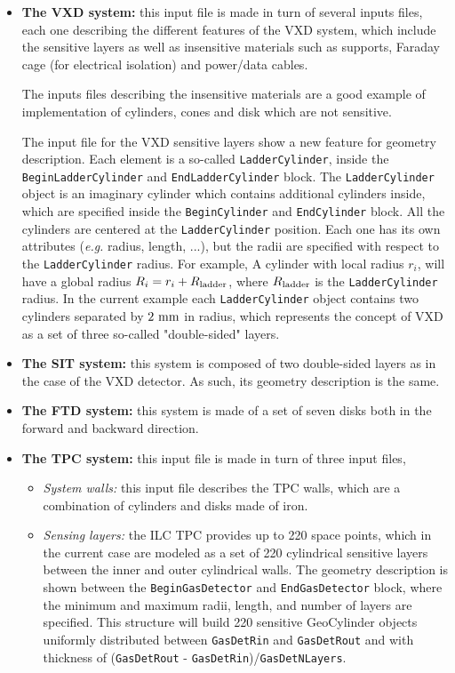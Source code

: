 \begin{itemize}
 \item  {\bf The VXD system:} this input file is made in turn of several inputs files, each one describing the different features of the VXD system, which include 
 the sensitive layers as well as insensitive materials such as supports, Faraday cage (for electrical isolation) and power/data cables.
 
 The inputs files describing the insensitive materials are a good example of implementation of cylinders, cones and disk which are not sensitive.
 
 The input file for the VXD sensitive layers show a new feature for geometry description. Each element is a so-called {\tt LadderCylinder}, inside the 
 {\tt BeginLadderCylinder} and {\tt EndLadderCylinder} block. The {\tt LadderCylinder} object is an imaginary cylinder which contains additional cylinders
 inside, which are specified inside the {\tt BeginCylinder} and {\tt EndCylinder} block. All the cylinders are centered at the {\tt LadderCylinder} position.
 Each one has its own attributes ({\it e.g.} radius, length, ...), but the radii are specified with respect to the {\tt LadderCylinder} radius. For example,
 A cylinder with local radius $r_i$, will have a global radius $R_i = r_i + R_{\rm ladder}$, where $R_{\rm ladder}$ is the {\tt LadderCylinder} radius.
 In the current example each {\tt LadderCylinder} object contains two cylinders separated by $2~{\rm mm}$ in radius, which represents the concept of VXD as 
 a set of three so-called "double-sided" layers.
 
 \item  {\bf The SIT system:} this system is composed of two double-sided layers as in the case of the VXD detector. As such, its geometry description is 
 the same.
 
 \item  {\bf The FTD system:} this system is made of a set of seven disks both in the forward and backward direction.
 
 \item  {\bf The TPC system:} this input file is made in turn of three input files,
   \begin{itemize}
    \item  {\it System walls:} this input file describes the TPC walls, which are a combination of cylinders and disks made of iron.
    
    \item  {\it Sensing layers:} the ILC TPC provides up to 220 space points, which in the current case are modeled as a set of 220 cylindrical sensitive 
    layers between the inner and outer cylindrical walls. The geometry description is shown between the {\tt BeginGasDetector} and {\tt EndGasDetector} block, where 
    the minimum and maximum radii, length, and number of layers are specified. This structure will build 220 sensitive GeoCylinder objects uniformly distributed 
    between {\tt GasDetRin} and {\tt GasDetRout} and with thickness of ({\tt GasDetRout} - {\tt GasDetRin})/{\tt GasDetNLayers}.
    

\end{itemize}
\end{itemize}
